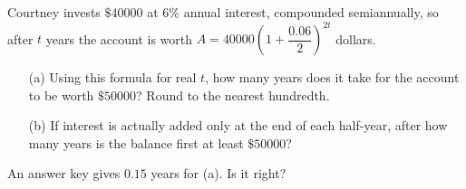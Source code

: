 Courtney invests $\$40000$ at $6\%$ annual interest, compounded semiannually, so after $t$ years the account is worth $A=40000\left(1+\dfrac{0.06}{2}\right)^{2t}$ dollars.
\begin{enumerate}
\item[(a)] Using this formula for real $t$, how many years does it take for the account to be worth $\$50000$? Round to the nearest hundredth.
\item[(b)] If interest is actually added only at the end of each half-year, after how many years is the balance first at least $\$50000$?
\end{enumerate}
An answer key gives $0.15$ years for (a). Is it right?
